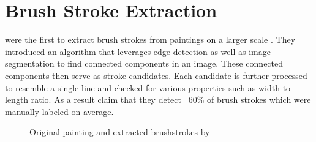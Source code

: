 \section{Brush Stroke Extraction}
\citeauthor*{rhythmic} were the first to extract brush strokes from paintings on a larger scale \cite{rhythmic}.
They introduced an algorithm that leverages edge detection as well as image segmentation to find connected components in an image.
These connected components then serve as stroke candidates.
Each candidate is further processed to resemble a single line and checked for various properties such as width-to-length ratio.
As a result \citeauthor*{rhythmic} claim that they detect ~60\% of brush strokes which were manually labeled on average.
\begin{figure}
    \qquad
    \caption[]{Original painting and extracted brushstrokes by \citeauthor*{rhythmic}}
\end{figure}

